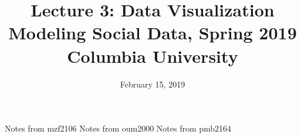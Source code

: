 \documentclass{article}
\title{
Lecture 3: Data Visualization \\  %
Modeling Social Data, Spring 2019 \\   %
Columbia University                    %
}
\date{February 15, 2019}                %
\makeatletter
\let\org@subfile
\renewcommand*{}[1]{%
  \filename@parse{#1}%
  \expandafter
  \graphicspath\expandafter{\expandafter{\filename@area}}%
  \org@subfile{#1}%
}
\makeatother
\begin{document}
\maketitle


\pagebreak \newpage \noindent\Huge{Notes from mzf2106} \normalsize \setcounter{section}{0} 
\pagebreak \newpage \noindent\Huge{Notes from oum2000} \normalsize \setcounter{section}{0} 
\pagebreak \newpage \noindent\Huge{Notes from pmb2164} \normalsize \setcounter{section}{0} 
\end{document}
